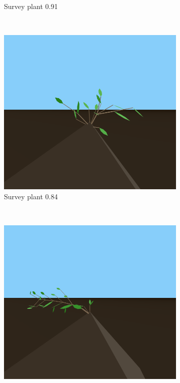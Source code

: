 \begin{figure}
\begin{subfigure}{0.48\textwidth}
        \caption{Survey plant 0.91}
    \end{subfigure}
    \\
    \begin{subfigure}{0.48\textwidth}
        \includegraphics[width=\textwidth]{figures/plant-84}
        \caption{Survey plant 0.84}
    \end{subfigure}
    ~
    \begin{subfigure}{0.48\textwidth}
        \includegraphics[width=\textwidth]{figures/plant-78}

\end{subfigure}
\end{figure}
